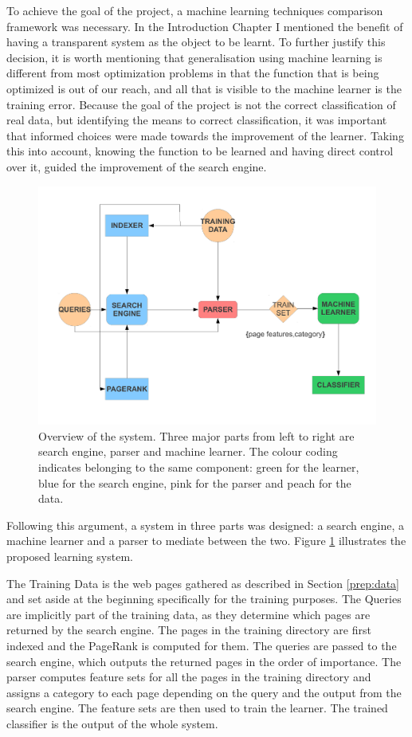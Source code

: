 \documentclass[12pt,notitlepage,twoside]{scrbook}
\begin{document}
To achieve the goal of the project, a machine learning techniques comparison framework was
necessary. In the Introduction Chapter I mentioned the benefit of having a transparent
system as the object to be learnt. To further justify this decision, it is worth mentioning
that generalisation using machine learning is different from most optimization problems in
that the function that is being optimized is out of our reach, and all that is visible to
the machine learner is the training error. Because the goal of the project is not the
correct classification of real data, but identifying the means to correct classification,
it was important that informed choices were made towards the improvement of the learner.
Taking this into account, knowing the function to be learned and having direct control
over it, guided the improvement of the search engine. 
\begin{figure}[h!]
\centering
\includegraphics[width=\textwidth]{figs/overview.pdf}
\caption{Overview of the system. Three major parts from left to right are search engine,
parser and machine learner. The colour coding indicates belonging to the same component:
green for the learner, blue for the search engine, pink for the parser and peach for the
data.\label{overview}}
\end{figure}

Following this argument, a system in three parts was designed: a search engine, a machine
learner and a parser to mediate between the two. Figure \ref{overview} illustrates the
proposed learning system.

The Training Data is the web pages gathered as described in Section \ref{prep:data} and
set aside at the beginning specifically for the training purposes. The Queries are
implicitly part of the training data, as they determine which pages are returned by the
search engine. The pages in the training directory are first indexed and the PageRank is
computed for them. The queries are passed to the search engine, which outputs the returned
pages in the order of importance. The parser computes feature sets for all the pages in
the training directory and assigns a category to each page depending on the query and the
output from the search engine. The feature sets are then used to train the learner. The
trained classifier is the output of the whole system.
\end{document}
